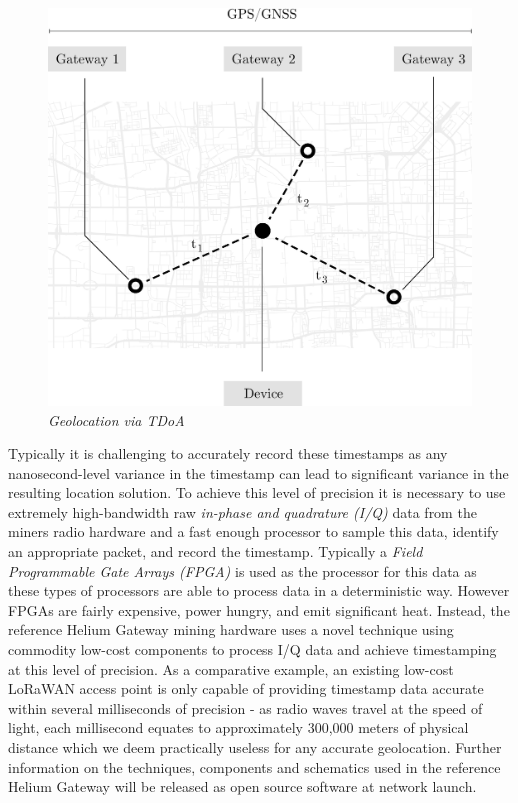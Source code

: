 \documentclass[10pt, nonatbib, nocopyrightspace, reprint]{sigplanconf}
\begin{document}
\begin{figure}[H]
    \begin{center}
          \includegraphics[width=\columnwidth]{tdoa.eps}
          \caption{\emph{Geolocation via TDoA}}
          \label{fig:tdoa}
     \end{center}
\end{figure}

Typically it is challenging to accurately record these timestamps as any nanosecond-level variance in the timestamp can lead to significant variance in the resulting location solution. To achieve this level of precision it is necessary to use extremely high-bandwidth raw \emph{in-phase and quadrature (I/Q)} data from the miners radio hardware and a fast enough processor to sample this data, identify an appropriate packet, and record the timestamp. Typically a \emph{Field Programmable Gate Arrays (FPGA)} is used as the processor for this data as these types of processors are able to process data in a deterministic way. However FPGAs are fairly expensive, power hungry, and emit significant heat. Instead, the reference Helium Gateway mining hardware uses a novel technique using commodity low-cost components to process I/Q data and achieve timestamping at this level of precision. As a comparative example, an existing low-cost LoRaWAN \cite{lorawan} access point is only capable of providing timestamp data accurate within several milliseconds of precision - as radio waves travel at the speed of light, each millisecond equates to approximately 300,000 meters of physical distance which we deem practically useless for any accurate geolocation. Further information on the techniques, components and schematics used in the reference Helium Gateway will be released as open source software at network launch.
\end{document}
